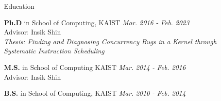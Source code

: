 
\begin{rSection}{Education}

\textbf{Ph.D} in School of Computing, KAIST \hfill {\em Mar. 2016 - Feb. 2023} \\
\setlength{\leftskip}{8pt} Advisor: Insik Shin \\
\textit{Thesis: Finding and Diagnosing Concurrency Bugs in a Kernel through Systematic Instruction Scheduling}

\setlength{\leftskip}{0pt}
\textbf{M.S.} in School of Computing KAIST \hfill {\em Mar. 2014 - Feb. 2016} \\
\setlength{\leftskip}{8pt} Advisor: Insik Shin

\setlength{\leftskip}{0pt}
\textbf{B.S.} in School of Computing, KAIST \hfill {\em Mar. 2010 - Feb. 2014}

\end{rSection}
